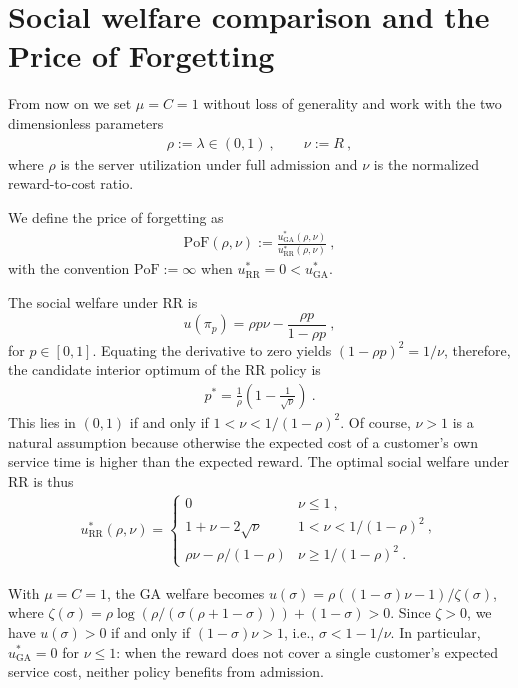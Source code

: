 \documentclass[11pt]{article}
\begin{document}


\section{Social welfare comparison and the Price of Forgetting}\label{sec:PoF}


From now on we set $\mu=C=1$ without loss of generality and work with the two dimensionless parameters
\begin{align}\label{eq:params}
    \rho := \lambda \in(0,1)\ ,\qquad \nu := R\ ,
\end{align}
where $\rho$ is the server utilization under full admission and $\nu$ is the normalized reward-to-cost ratio.

We define the price of forgetting as
\begin{align}\label{eq:PoF_def}
    \mathrm{PoF}(\rho,\nu) := \frac{u^*_{\mathrm{GA}}(\rho,\nu)}{u^*_{\mathrm{RR}}(\rho,\nu)}\ ,
\end{align}
with the convention $\mathrm{PoF}:=\infty$ when $u^*_{\mathrm{RR}}=0<u^*_{\mathrm{GA}}$.

The social welfare under RR is 
$$u(\pi_p) = \rho p\nu - \frac{\rho p}{1-\rho p}\ ,$$
for $p\in[0,1]$. Equating the derivative to zero yields $(1-\rho p)^2=1/\nu$, therefore, the candidate interior optimum of the RR policy is
\begin{align}\label{eq:p_star}
    p^* = \frac{1}{\rho}\left(1 - \frac{1}{\sqrt{\nu}}\right)\ .
\end{align}
This lies in $(0,1)$ if and only if $1 < \nu < 1/(1-\rho)^2$. Of course, $\nu>1$ is a natural assumption because otherwise the expected cost of a customer's own service time is higher than the expected reward.  The optimal social welfare under RR is thus
\begin{align}\label{eq:u_RR}
u^*_{\mathrm{RR}}(\rho,\nu) = \begin{cases}
    0 & \nu \leq 1\ , \\
    1+\nu-2\sqrt{\nu} & 1 < \nu < 1/(1-\rho)^2\ , \\
    \rho\nu - \rho/(1-\rho) & \nu \geq 1/(1-\rho)^2\ .
\end{cases}
\end{align}

With $\mu=C=1$, the GA welfare becomes $u(\sigma) = \rho((1-\sigma)\nu - 1)/\zeta(\sigma)$, where $\zeta(\sigma)=\rho\log(\rho/(\sigma(\rho+1-\sigma)))+(1-\sigma)>0$.  Since $\zeta>0$, we have $u(\sigma)>0$ if and only if $(1-\sigma)\nu>1$, i.e., $\sigma<1-1/\nu$.  In particular, $u^*_{\mathrm{GA}}=0$ for $\nu\leq 1$: when the reward does not cover a single customer's expected service cost, neither policy benefits from admission.
 
\end{document}
